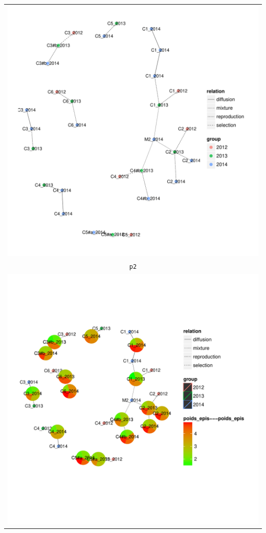 \documentclass{article}\usepackage[]{graphicx}\usepackage[]{color}
\newenvironment{knitrout}{}{} %
\begin{document}
\begin{itemize}
\begin{itemize}
\begin{center}
\begin{tabular}{c}
\begin{knitrout}
{\centering \includegraphics[width=.6\textwidth]{figures/shinemas2R_unnamed-chunk-81-1} 

}



\end{knitrout}
\\
\texttt{p2}\\
\begin{knitrout}
\definecolor{shadecolor}{rgb}{0.969, 0.969, 0.969}\color{fgcolor}

{\centering \includegraphics[width=.8\textwidth]{figures/shinemas2R_unnamed-chunk-82-1} 

}



\end{knitrout}
\\
\end{tabular}
\end{center}


\end{itemize}
\end{itemize}
\end{document}
